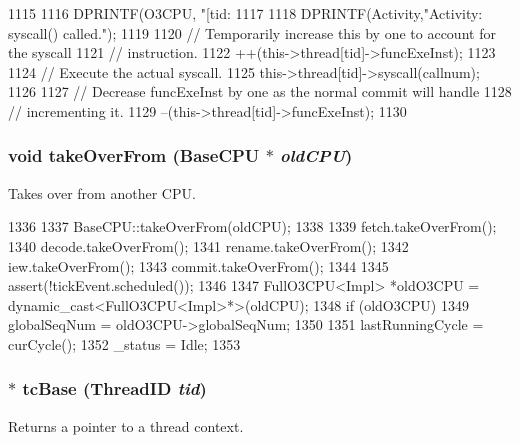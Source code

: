 \begin{DoxyCode}
1115 {
1116     DPRINTF(O3CPU, "[tid:%
1117 
1118     DPRINTF(Activity,"Activity: syscall() called.\n");
1119 
1120     // Temporarily increase this by one to account for the syscall
1121     // instruction.
1122     ++(this->thread[tid]->funcExeInst);
1123 
1124     // Execute the actual syscall.
1125     this->thread[tid]->syscall(callnum);
1126 
1127     // Decrease funcExeInst by one as the normal commit will handle
1128     // incrementing it.
1129     --(this->thread[tid]->funcExeInst);
1130 }
\end{DoxyCode}
\hypertarget{classFullO3CPU_ac82d2b8d331b2e8e6854a95d2917dfa2}{
\subsubsection[{takeOverFrom}]{\setlength{\rightskip}{0pt plus 5cm}void takeOverFrom ({\bf BaseCPU} $\ast$ {\em oldCPU})}}
\label{classFullO3CPU_ac82d2b8d331b2e8e6854a95d2917dfa2}
Takes over from another CPU. 


\begin{DoxyCode}
1336 {
1337     BaseCPU::takeOverFrom(oldCPU);
1338 
1339     fetch.takeOverFrom();
1340     decode.takeOverFrom();
1341     rename.takeOverFrom();
1342     iew.takeOverFrom();
1343     commit.takeOverFrom();
1344 
1345     assert(!tickEvent.scheduled());
1346 
1347     FullO3CPU<Impl> *oldO3CPU = dynamic_cast<FullO3CPU<Impl>*>(oldCPU);
1348     if (oldO3CPU)
1349         globalSeqNum = oldO3CPU->globalSeqNum;
1350 
1351     lastRunningCycle = curCycle();
1352     _status = Idle;
1353 }
\end{DoxyCode}
\hypertarget{classFullO3CPU_acaae0f849591d618f1c202e5ed29b4e4}{
\subsubsection[{tcBase}]{$\ast$ tcBase ({\bf ThreadID} {\em tid})}}
\label{classFullO3CPU_acaae0f849591d618f1c202e5ed29b4e4}
Returns a pointer to a thread context. 



